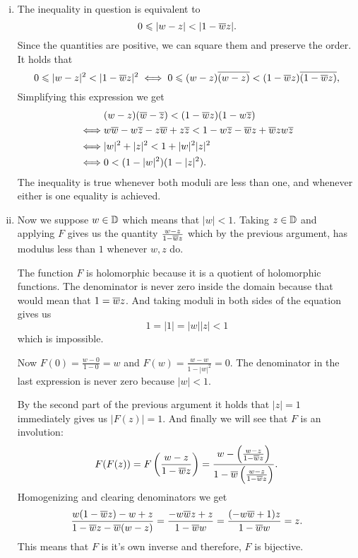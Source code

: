 \documentclass[12pt]{memoir}
\begin{document}
    \begin{ptcbr}
        \begin{enumerate}[i)]
            \itemsep=-0.4em
            \item The inequality in question is equivalent to 
            $$0\leq|w-z|<|1-\ov wz|.$$
            Since the quantities are positive, we can square them and preserve the order. It holds that 
            $$0\leq|w-z|^2<|1-\ov wz|^2\iff 0\leq (w-z)\ov{(w-z)}<(1-\ov wz)\ov{(1-\ov wz)},$$
            Simplifying this expression we get 
            \begin{align*}
                &(w-z)(\overline w-\overline z)<(1-\overline wz)(1-w\overline z)\\
                \iff&w\overline w-w\overline z -z\overline w+z\overline z<1-w\overline z-\overline wz+\overline wzw\overline z\\
                \iff&|w|^2+|z|^2<1+|w|^2|z|^2\\
                \iff&0<(1-|w|^2)(1-|z|^2).
            \end{align*}
            The inequality is true whenever both moduli are less than one, and whenever either is one equality is achieved.
            \item Now we suppose $w\in\mathbb{D}$ which means that $|w|<1$. Taking $z\in\mathbb{D}$ and applying $F$ gives us the quantity $\frac{w-z}{1-\overline w z}$ which by the previous argument, has modulus less than $1$ whenever $w,z$ do.\par 
            The function $F$ is holomorphic because it is a quotient of holomorphic functions. The denominator is never zero inside the domain because that would mean that $1=\overline w z$. And taking moduli in both sides of the equation gives us 
            $$1=|1|=|w||z|<1$$
            which is impossible.\par 
            Now $F(0)=\frac{w-0}{1-0}=w$ and $F(w)=\frac{w-w}{1-|w|^2}=0$. The denominator in the last expression is never zero because $|w|<1$.\par 
            By the second part of the previous argument it holds that $|z|=1$ immediately gives us $|F(z)|=1$. And finally we will see that $F$ is an involution:
            $$F(F(z))=F\left(\frac{w-z}{1-\overline w z}\right)=\frac{w-\left(\frac{w-z}{1-\overline w z}\right)}{1-\overline w\left(\frac{w-z}{1-\overline w z}\right)}.$$ 
            Homogenizing and clearing denominators we get 
            $$\frac{w(1-\overline wz)-w+z}{1-\overline w z-\overline w(w-z)}=\frac{-w\overline wz+z}{1-\overline ww}=\frac{(-w\overline w+1)z}{1-\overline ww}=z.$$
            This means that $F$ is it's own inverse and therefore, $F$ is bijective. 
        \end{enumerate}
    \end{ptcbr}
\end{document}
